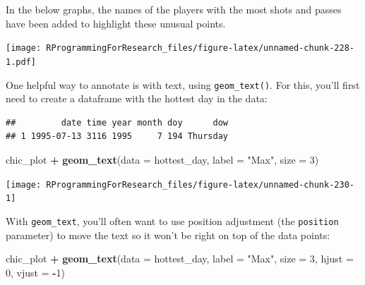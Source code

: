 \documentclass[]{book}
\makeatletter
\newenvironment{Shaded}{\begin{snugshade}}{\end{snugshade}}
\newcommand{\KeywordTok}[1]{\textcolor[rgb]{0.13,0.29,0.53}{\textbf{#1}}}
\newcommand{\DataTypeTok}[1]{\textcolor[rgb]{0.13,0.29,0.53}{#1}}
\newcommand{\DecValTok}[1]{\textcolor[rgb]{0.00,0.00,0.81}{#1}}
\newcommand{\StringTok}[1]{\textcolor[rgb]{0.31,0.60,0.02}{#1}}
\newcommand{\OperatorTok}[1]{\textcolor[rgb]{0.81,0.36,0.00}{\textbf{#1}}}
\newcommand{\NormalTok}[1]{#1}
\newenvironment{kframe}{%
\medskip{}
\setlength{\fboxsep}{.8em}
 \def\at@end@of@kframe{}%
 \ifinner\ifhmode%
  \def\at@end@of@kframe{\end{minipage}}%
  \begin{minipage}{\columnwidth}%
 \fi\fi%
 \def\FrameCommand##1{\hskip\@totalleftmargin \hskip-\fboxsep
 \colorbox{shadecolor}{##1}\hskip-\fboxsep
     \hskip-\linewidth \hskip-\@totalleftmargin \hskip\columnwidth}%
 \MakeFramed {\advance\hsize-\width
   \@totalleftmargin\z@ \linewidth\hsize
   \@setminipage}}%
 {\par\unskip\endMakeFramed%
 \at@end@of@kframe}
\renewenvironment{Shaded}{\begin{kframe}}{\end{kframe}}
\theoremstyle{definition}
\theoremstyle{definition}
\theoremstyle{definition}
\theoremstyle{remark}
\makeatother
\begin{document}
In the below graphs, the names of the players with the most shots and
passes have been added to highlight these unusual points. \bigskip

\texttt{[image: RProgrammingForResearch\_files/figure-latex/unnamed-chunk-228-1.pdf]}

One helpful way to annotate is with text, using \texttt{geom\_text()}.
For this, you'll first need to create a dataframe with the hottest day
in the data:

\begin{Shaded}
\end{Shaded}

\begin{verbatim}
##         date time year month doy      dow
## 1 1995-07-13 3116 1995     7 194 Thursday
\end{verbatim}

\begin{Shaded}
\begin{Highlighting}[]
\NormalTok{chic_plot }\OperatorTok{+}\StringTok{ }\KeywordTok{geom_text}\NormalTok{(}\DataTypeTok{data =}\NormalTok{ hottest_day, }
                      \DataTypeTok{label =} \StringTok{"Max"}\NormalTok{,}
                      \DataTypeTok{size =} \DecValTok{3}\NormalTok{)}
\end{Highlighting}
\end{Shaded}

\begin{center}\texttt{[image: RProgrammingForResearch\_files/figure-latex/unnamed-chunk-230-1]} \end{center}

With \texttt{geom\_text}, you'll often want to use position adjustment
(the \texttt{position} parameter) to move the text so it won't be right
on top of the data points:

\begin{Shaded}
\begin{Highlighting}[]
\NormalTok{chic_plot }\OperatorTok{+}\StringTok{ }\KeywordTok{geom_text}\NormalTok{(}\DataTypeTok{data =}\NormalTok{ hottest_day, }
                      \DataTypeTok{label =} \StringTok{"Max"}\NormalTok{,}
                      \DataTypeTok{size =} \DecValTok{3}\NormalTok{, }\DataTypeTok{hjust =} \DecValTok{0}\NormalTok{, }\DataTypeTok{vjust =} \OperatorTok{-}\DecValTok{1}\NormalTok{)}
\end{Highlighting}
\end{Shaded}
\end{document}
